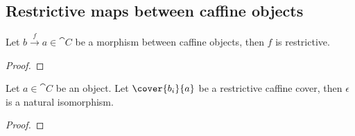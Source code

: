 \subsection{Restrictive maps between caffine objects}

\begin{lemma}
Let $b\xrightarrow{f} a \in \cat{C}$ be a morphism between caffine objects, then $f$ is restrictive.
\end{lemma}

\begin{proof}

\end{proof}

\begin{lemma}
Let $a\in \cat{C}$ be an object. 
Let $\cover{b_i}{a}$ be a restrictive caffine cover, then $\epsilon$ is a natural isomorphism.
\end{lemma}

\begin{proof}

\end{proof}